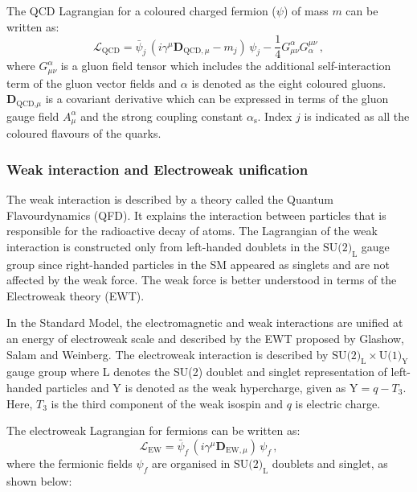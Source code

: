 The QCD Lagrangian for a coloured charged fermion ($\psi$) of mass $m$ can be written as:
\begin{equation}
\mathcal{L}_{\text{QCD}} = \bar{\psi}_{j} \, (i\gamma^{\mu}\textbf{D}_{\text{QCD,}\,\mu} - m_{j}) \, \psi_{j} - \frac{1}{4}G_{\mu\nu}^{\alpha}G^{\mu\nu}_{\alpha} \,,
\end{equation}
where $G_{\mu\nu}^{\alpha}$ is a gluon field tensor which includes the additional self-interaction term of the gluon vector fields and $\alpha$ is denoted as the eight coloured gluons. $\textbf{D}_{\text{QCD,}\mu}$ is a covariant derivative which can be expressed in terms of the gluon gauge field $A_{\mu}^{\alpha}$ and the strong coupling constant $\alpha_{\text{s}}$. Index $j$ is indicated as all the coloured flavours of the quarks.~\cite{halzen}

\subsubsection{Weak interaction and Electroweak unification}%
\label{sec:theory:standardmodel:weak}
The weak interaction is described by a theory called the Quantum Flavourdynamics (QFD). It explains the interaction between particles that is responsible for the radioactive decay of atoms. The Lagrangian of the weak interaction is constructed only from left-handed doublets in the $\text{SU(2)}_{\text{L}}$ gauge group since right-handed particles in the SM appeared as singlets and are not affected by the weak force. The weak force is better understood in terms of the Electroweak theory (EWT).~\cite{halzen}


In the Standard Model, the electromagnetic and weak interactions are unified at an energy of electroweak scale and described by the EWT proposed by Glashow, Salam and Weinberg. The electroweak interaction is described by $\text{SU(2)}_{\text{L}} \times \text{U(1)}_{\text{Y}}$ gauge group where L denotes the SU(2) doublet and singlet representation of left-handed particles and Y is denoted as the weak hypercharge, given as $\text{Y}=q-T_{3}$. Here, $T_{3}$ is the third component of the weak isospin and $q$ is electric charge.~\cite{halzen}

The electroweak Lagrangian for fermions can be written as:
\begin{equation}
\mathcal{L}_{\text{EW}} = \bar{\psi}_{f} \, (i\gamma^{\mu}\textbf{D}_{\text{EW,}\,\mu}) \, \psi_{f} \,,
\end{equation}
where the fermionic fields $\psi_{f}$ are organised in $\text{SU(2)}_{\text{L}}$ doublets and singlet, as shown below:

